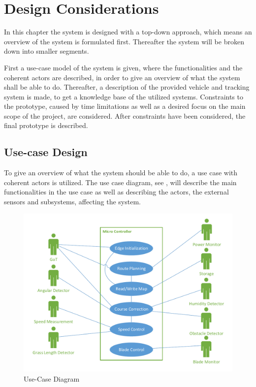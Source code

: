 \chapter{Design Considerations}
In this chapter the system is designed with a top-down approach, which means an overview of the system is formulated first. Thereafter the system will be broken down into smaller segments.

First a use-case model of the system is given, where the functionalities and the coherent actors are described, in order to give an overview of what the system shall be able to do. Thereafter, a description of the provided vehicle and tracking system is made, to get a knowledge base of the utilized systems. Constraints to the prototype, caused by time limitations as well as a desired focus on the main scope of the project, are considered.
After constraints have been considered, the final prototype is described.
\section{Use-case Design} \label{sec:UseCase}
To give an overview of what the system should be able to do, a use case with coherent actors is utilized. The use case diagram, see , will describe the main functionalities in the use case as well as describing the actors, the external sensors and subsystems, affecting the system.

%
 \begin{figure}[H]
	\centering
	\includegraphics[scale=0.8]{figures/P5UseCase.pdf}
	\caption{Use-Case Diagram}
	\label{fig:usecase}
\end{figure}\vspace{-5mm}

